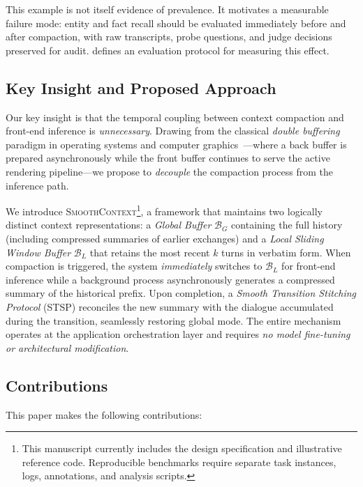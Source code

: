 \documentclass[10pt,twocolumn]{article}
\newcommand{\sys}{\textsc{SmoothContext}}
\newcommand{\bufG}{\mathcal{B}_G}
\newcommand{\bufL}{\mathcal{B}_L}
\begin{document}
This example is not itself evidence of prevalence. It motivates a measurable failure mode: entity and fact recall should be evaluated immediately before and after compaction, with raw transcripts, probe questions, and judge decisions preserved for audit.  defines an evaluation protocol for measuring this effect.

\subsection{Key Insight and Proposed Approach}\label{sec:insight}

Our key insight is that the temporal coupling between context compaction and front-end inference is \emph{unnecessary}. Drawing from the classical \emph{double buffering} paradigm in operating systems and computer graphics~\cite{tanenbaum2015modern}---where a back buffer is prepared asynchronously while the front buffer continues to serve the active rendering pipeline---we propose to \emph{decouple} the compaction process from the inference path.

We introduce \sys{}\footnote{This manuscript currently includes the design specification and illustrative reference code. Reproducible benchmarks require separate task instances, logs, annotations, and analysis scripts.}, a framework that maintains two logically distinct context representations: a \emph{Global Buffer} $\bufG$ containing the full history (including compressed summaries of earlier exchanges) and a \emph{Local Sliding Window Buffer} $\bufL$ that retains the most recent $k$ turns in verbatim form. When compaction is triggered, the system \emph{immediately} switches to $\bufL$ for front-end inference while a background process asynchronously generates a compressed summary of the historical prefix. Upon completion, a \emph{Smooth Transition Stitching Protocol} (STSP) reconciles the new summary with the dialogue accumulated during the transition, seamlessly restoring global mode. The entire mechanism operates at the application orchestration layer and requires \emph{no model fine-tuning or architectural modification}.

\subsection{Contributions}

This paper makes the following contributions:
\end{document}
